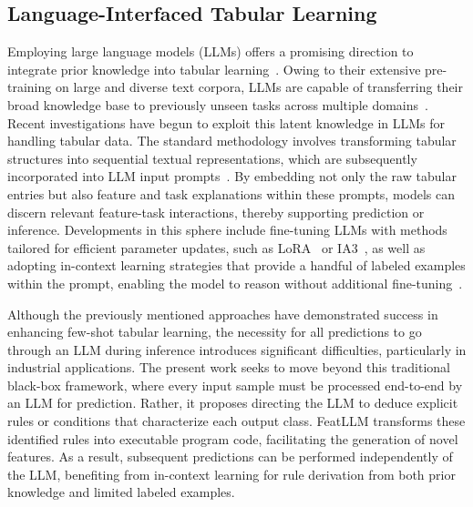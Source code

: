 \subsection{Language-Interfaced Tabular Learning} Employing large language models (LLMs) offers a promising direction to integrate prior knowledge into tabular learning~\cite{anil2023palm,openai2023gpt4}. Owing to their extensive pre-training on large and diverse text corpora, LLMs are capable of transferring their broad knowledge base to previously unseen tasks across multiple domains~\cite{brown2020language}. Recent investigations have begun to exploit this latent knowledge in LLMs for handling tabular data. The standard methodology involves transforming tabular structures into sequential textual representations, which are subsequently incorporated into LLM input prompts~\cite{dinh2022lift,hegselmann2023tabllm,wang2023anypredict}. By embedding not only the raw tabular entries but also feature and task explanations within these prompts, models can discern relevant feature-task interactions, thereby supporting prediction or inference. Developments in this sphere include fine-tuning LLMs with methods tailored for efficient parameter updates, such as LoRA~\cite{hu2021lora} or IA3~\cite{liu2022few}, as well as adopting in-context learning strategies that provide a handful of labeled examples within the prompt, enabling the model to reason without additional fine-tuning~\cite{dinh2022lift,hegselmann2023tabllm,nam2023semi,slack2023tablet}.

Although the previously mentioned approaches have demonstrated success in enhancing few-shot tabular learning, the necessity for all predictions to go through an LLM during inference introduces significant difficulties, particularly in industrial applications. The present work seeks to move beyond this traditional black-box framework, where every input sample must be processed end-to-end by an LLM for prediction. Rather, it proposes directing the LLM to deduce explicit rules or conditions that characterize each output class. \textsf{FeatLLM} transforms these identified rules into executable program code, facilitating the generation of novel features. As a result, subsequent predictions can be performed independently of the LLM, benefiting from in-context learning for rule derivation from both prior knowledge and limited labeled examples.

